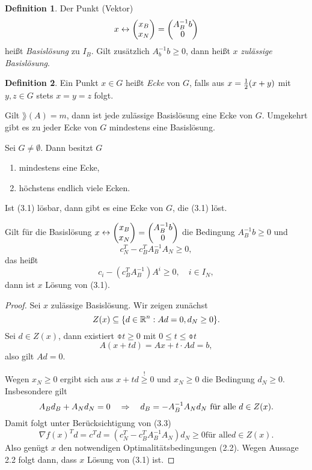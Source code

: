 \documentclass[
 a4paper,
 12pt,
 parskip=half
 ]{scrartcl}
\theoremstyle{plain}
\theoremstyle{definition}
\newtheorem{defn}{Definition}
\numberwithin{rmrk}{section}
\numberwithin{defn}{section}
\numberwithin{exmp}{section}
\numberwithin{equation}{section}
\begin{document}
\begin{defn} %
  Der Punkt (Vektor)
  \[ x \leftrightarrow \begin{pmatrix} x_B \\ x_N \end{pmatrix} = \begin{pmatrix}A_B^{-1} b \\ 0 \end{pmatrix} \]
  heißt \emph{Basislösung} zu $I_B$. Gilt zusätzlich $A_b^{-1} b \ge 0$, dann
  heißt $x$ \emph{zulässige Basislösung}.
\end{defn}

\begin{defn} %
  Ein Punkt $x \in G$ heißt \emph{Ecke} von $G$, falls aus $x = \frac{1}{2}(x+y)$
  mit $y,z \in G$ stets $x = y = z$ folgt.
\end{defn}

\clearpage

\begin{thm} %
  Gilt $\rang(A) = m$, dann ist jede zulässige Basislösung eine Ecke von $G$.
  Umgekehrt gibt es zu jeder Ecke von $G$ mindestens eine Basislösung.
\end{thm}

\begin{thm} %
  Sei $G \ne \emptyset$. Dann besitzt $G$
  \begin{enumerate}[(1)]
  \item mindestens eine Ecke,
  \item höchstens endlich viele Ecken.
  \end{enumerate}
\end{thm}

\begin{thm} %
  Ist (3.1) lösbar, dann gibt es eine Ecke von $G$, die (3.1) löst.
\end{thm}

\begin{aus}[Optimalitätskriterium] %
  Gilt für die Basislösung $x \leftrightarrow \begin{pmatrix}x_B \\ x_N \end{pmatrix} =
  \begin{pmatrix}A_B^{-1} b \\ 0 \end{pmatrix}$ die Bedingung $A_B^{-1} b \ge 0$ und
  \[ c_N^T - c_B^T A_B^{-1} A_N \ge 0, \]
  das heißt
  \[ c_i - (c_B^T A_B^{-1})A^i \ge 0, \quad i \in I_N, \]
  dann ist $x$ Lösung von (3.1).
\end{aus}

\begin{proof}
  Sei $x$ zulässige Basislösung. Wir zeigen zunächst
  \[ Z(x) \subseteq \{ d \in \mathbb{R}^n : Ad = 0, d_N \ge 0 \}. \]
  Sei $d \in Z(x)$, dann existiert $\obar{t} \ge 0$ mit $0 \le t \le \obar{t}$
  \[ A(x+td) = Ax + t \cdot Ad = b, \]
  also gilt $Ad = 0$.

  Wegen $x_N \ge 0$ ergibt sich aus $x + td \overset{!}{\ge} 0$ und $x_N \ge 0$
  die Bedingung $d_N \ge 0$. Insbesondere gilt
  \[ A_B d_B + A_N d_N = 0 \quad \Rightarrow \quad d_B = - A_B^{-1} A_N d_N \text{ für alle } d
    \in Z(x). \]
  Damit folgt unter Berücksichtigung von (3.3)
  \[ \nabla f(x)^T d = c^T d = ( c_N^T - c_B^T A_B^{-1} A_N) d_N \ge 0 \text{
      für alle} d \in Z(x). \]
  Also genügt $x$ den notwendigen Optimalitätsbedingungen (2.2). Wegen Aussage
  2.2 folgt dann, dass $x$ Lösung von (3.1) ist.
\end{proof}
\end{document}

